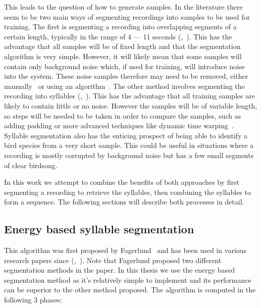 This leads to the question of how to generate samples. In the literature there
seem to be two main ways of segmenting recordings into samples to be used for
training. The first is segmenting a recording into overlapping segments of a
certain length, typically in the range of 4 --- 11 seconds
(\cite{yan2021birdsong},~\cite{crous2019polyphonic}). This has the advantage
that all samples will be of fixed length and that the segmentation algorithm is
very simple. However, it will likely mean that some samples will contain only
background noise which, if used for training, will introduce noise into the
system. These noise samples therefore may need to be removed, either
manually~\cite{yan2021birdsong} or using an
algorithm~\cite{narasimhan2017simultaneous}. The other method involves
segmenting the recording into syllables
(\cite{fagerlund2007bird},~\cite{ramashini2022robust}). This has the advantage
that all training samples are likely to contain little or no noise. However the
samples will be of variable length, so steps will be needed to be taken in order
to compare the samples, such as adding padding or more advanced techniques like
dynamic time warping~\cite{somervuo2006parametric}. Syllable segmentation also
has the enticing prospect of being able to identify a bird species from a very
short sample. This could be useful in situations where a recording is mostly
corrupted by background noise but has a few small segments of clear birdsong.

In this work we attempt to combine the benefits of both approaches by first
segmenting a recording to retrieve the syllables, then combining the syllables
to form a sequence. The following sections will describe both processes in
detail.

\subsection{Energy based syllable segmentation}\label{ssec:syllable_seg}

This algorithm was first proposed by Fagerlund~\cite{fagerlund2004automatic}
and has been used in various research papers since
(\cite{somervuo2006parametric},~\cite{ramashini2022robust}). Note that Fagerlund
proposed two different segmentation methods in the paper. In this thesis we use
the energy based segmentation method as it's relatively
simple to implement and its performance can be superior to the other method
proposed. The algorithm is computed in the following 3 phases:

